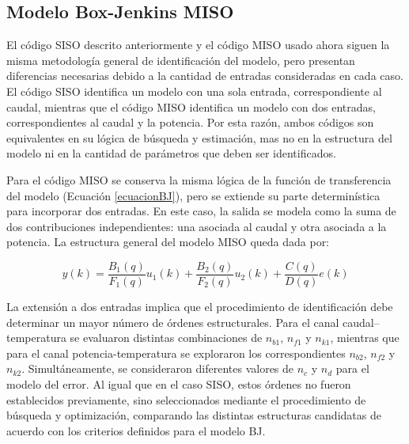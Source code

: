 \documentclass[11pt]{report}
\begin{document}
\subsection{Modelo Box-Jenkins MISO}
El código SISO descrito anteriormente y el código MISO usado ahora siguen la misma metodología general de identificación del modelo, pero presentan diferencias necesarias debido a la cantidad de entradas consideradas en cada caso. El código SISO identifica un modelo con una sola entrada, correspondiente al caudal, mientras que el código MISO identifica un modelo con dos entradas, correspondientes al caudal y la potencia. Por esta razón, ambos códigos son equivalentes en su lógica de búsqueda y estimación, mas no en la estructura del modelo ni en la cantidad de parámetros que deben ser identificados.



Para el código MISO se  conserva la misma lógica de la función de transferencia del modelo (Ecuación \ref{ecuacionBJ}), pero se extiende su parte determinística para incorporar dos entradas. En este caso, la salida se modela como la suma de dos contribuciones independientes: una asociada al caudal y otra asociada a la potencia. La estructura general del modelo MISO queda dada por:

$$y(k)=\frac{B_1(q)}{F_1(q)}u_1(k)+\frac{B_2(q)}{F_2(q)}u_2(k)+\frac{C(q)}{D(q)}e(k)$$


La extensión a dos entradas implica que el procedimiento de identificación debe determinar un mayor número de órdenes estructurales. Para el canal caudal–temperatura se evaluaron distintas combinaciones de $n_{b1}$, $n_{f1}$ y $n_{k1}$, mientras que para el canal potencia-temperatura se exploraron los correspondientes $n_{b2}$, $n_{f2}$ y $n_{k2}$. Simultáneamente, se consideraron diferentes valores de $n_c$ y $n_d$ para el modelo del error. Al igual que en el caso SISO, estos órdenes no fueron establecidos previamente, sino seleccionados mediante el procedimiento de búsqueda y optimización, comparando las distintas estructuras candidatas de acuerdo con los criterios definidos para el modelo BJ. 
\end{document}
